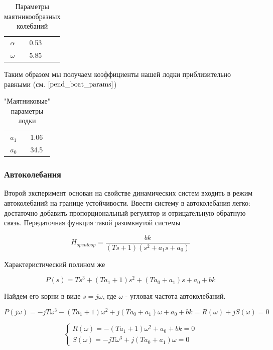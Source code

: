 \documentclass[a4paper]{article}
\begin{document}
\begin{table}[h]
	\caption{Параметры маятникообразных колебаний}
	\label{boat_pend_params}
	\begin{center}
		\begin{tabular}{ccc}
			$\alpha$ &  0.53 \\
			$\omega$ &  5.85 \\
		\end{tabular}
	\end{center}
\end{table}

Таким образом мы получаем коэффициенты нашей лодки приблизительно равными  (см. $\ref{pend_boat_params}$)

\begin{table}[h]
	\caption{"Маятниковые" параметры лодки}
	\label{pend_boat_params}
	\begin{center}
		\begin{tabular}{cc}
			$a_1$ &  1.06 \\
			$a_0$ &  34.5 \\
		\end{tabular}
	\end{center}
\end{table}


\subsubsection{Автоколебания}

Второй эксперимент основан на свойстве динамических систем входить в режим автоколебаний на границе устойчивости. Ввести систему в автоколебания легко: достаточно добавить пропорциональный регулятор и отрицательную обратную связь. Передаточная функция такой разомкнутой системы

$$ H_{openloop} = \frac{bk}{(Ts+1)(s^2+a_1s+a_0)} $$

Характеристический полином же

$$ P(s) = Ts^3 + (Ta_1+1)s^2 + (Ta_0+a_1)s + a_0 + bk $$

Найдем его корни в виде $s=j\omega$, где $\omega$ - угловая частота автоколебаний.

$$ P(j\omega) = -jT\omega^3 - (Ta_1+1)\omega^2 + j(Ta_0+a_1)\omega + a_0 + bk  = R(\omega) + jS(\omega) = 0$$

\begin{equation*}
	\begin{cases}
		R(\omega) = - (Ta_1+1)\omega^2 + a_0 + bk = 0
		\\
		S(\omega) = -jT\omega^3 + j(Ta_0+a_1)\omega = 0
	\end{cases}
\end{equation*}
\end{document}
